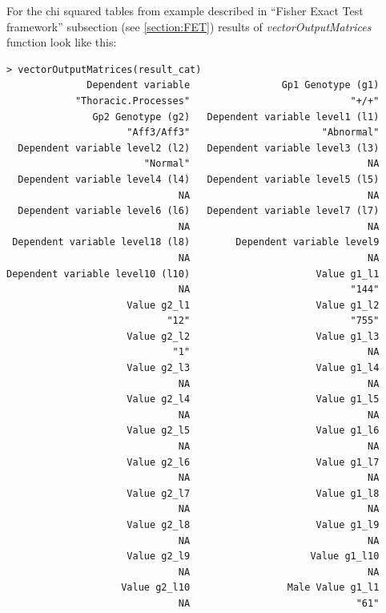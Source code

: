 \documentclass[12pt,a4paper]{article}
\begin{document}
For the chi squared tables from example described in ``Fisher Exact Test framework'' subsection (see \ref{section:FET}) results of \textit{vectorOutputMatrices} function look like this:
\begingroup
    \fontsize{8pt}{12pt}\selectfont
\begin{verbatim}
> vectorOutputMatrices(result_cat)
              Dependent variable                Gp1 Genotype (g1) 
            "Thoracic.Processes"                            "+/+" 
               Gp2 Genotype (g2)   Dependent variable level1 (l1) 
                     "Aff3/Aff3"                       "Abnormal" 
  Dependent variable level2 (l2)   Dependent variable level3 (l3) 
                        "Normal"                               NA 
  Dependent variable level4 (l4)   Dependent variable level5 (l5) 
                              NA                               NA 
  Dependent variable level6 (l6)   Dependent variable level7 (l7) 
                              NA                               NA 
 Dependent variable level18 (l8)        Dependent variable level9 
                              NA                               NA 
Dependent variable level10 (l10)                      Value g1_l1 
                              NA                            "144" 
                     Value g2_l1                      Value g1_l2 
                            "12"                            "755" 
                     Value g2_l2                      Value g1_l3 
                             "1"                               NA 
                     Value g2_l3                      Value g1_l4 
                              NA                               NA 
                     Value g2_l4                      Value g1_l5 
                              NA                               NA 
                     Value g2_l5                      Value g1_l6 
                              NA                               NA 
                     Value g2_l6                      Value g1_l7 
                              NA                               NA 
                     Value g2_l7                      Value g1_l8 
                              NA                               NA 
                     Value g2_l8                      Value g1_l9 
                              NA                               NA 
                     Value g2_l9                     Value g1_l10 
                              NA                               NA 
                    Value g2_l10                 Male Value g1_l1 
                              NA                             "61" 

\end{verbatim}
\end{document}
